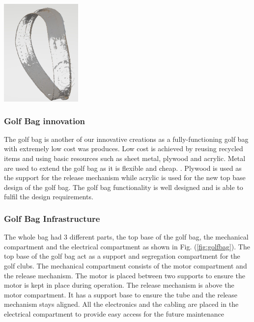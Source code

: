 \documentclass[11pt,landscape]{article}
\newenvironment{Figure}
  {\par\medskip\noindent\minipage{\linewidth}}
  {\endminipage\par\medskip}
\begin{document}
\begin{multicols}{3}
    
        \begin{Figure}
        \begin{center}
            \includegraphics[width=0.3\textwidth]{Figure.jpg}
            \label{fig:CAD}
        \end{center}
    \end{Figure}
    \subsubsection{Golf Bag innovation}
    The golf bag is another of our innovative creations as a fully-functioning
    golf bag with extremely low cost was produces. Low cost is achieved by reusing recycled
    items and using basic resources such as sheet metal, plywood and acrylic.
    Metal are used to extend the golf bag as it is flexible and cheap. . Plywood
    is used as the support for the release mechanism while acrylic is used for
    the new top base design of the golf bag. The golf bag functionality is well
    designed and is able to fulfil the design requirements.

    
    \subsubsection{Golf Bag Infrastructure}
      The whole bag had 3 different parts, the top base of the golf bag, the
    mechanical compartment and the electrical compartment as shown in Fig.
    (\ref{fig:golfbag}). The top base of the golf bag act as a support and
    segregation compartment for the golf clubs. The mechanical compartment
    consists of the motor compartment and the release mechanism. The motor is
    placed between two supports to ensure the motor is kept in place during
    operation. The release mechanism is above the motor compartment. It has a
    support base to ensure the tube and the release mechanism stays aligned. All
    the electronics and the cabling are placed in the electrical compartment to provide easy access for the future maintenance


\end{multicols}
\end{document}
